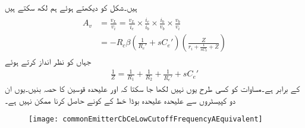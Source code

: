 ہیں۔شکل کو دیکھتے ہوئے ہم لکھ سکتے ہیں
\begin{gather}
\begin{aligned}\label{مساوات_تعددی_ردعمل_قابو_مخارج_کپیسٹر}
A_v&=\frac{v_L}{v_i}=\frac{v_L}{i_c} \times \frac{i_c}{i_b} \times \frac{i_b}{v_b} \times \frac{v_b}{v_i}\\
&=-R_c \beta \left(\frac{1}{R_e'}+s C_e' \right) \left(\frac{Z}{r_i+\frac{1}{sC_b}+Z} \right)
\end{aligned}
\end{gather}
جہاں  کو نظر انداز کرتے ہوئے
\begin{align*}
\frac{1}{Z}=\frac{1}{R_1}+\frac{1}{R_2}+\frac{1}{R_e'}+s C_e'
\end{align*}
کے برابر ہے۔مساوات   کو کسی طرح یوں نہیں لکھا جا سکتا کہ  اور  علیحدہ قوسین کا حصہ بنیں۔یوں ان دو کپیسٹروں سے علیحدہ علیحدہ بوڈا خط کے کونے حاصل کرنا ممکن نہیں ہے۔
%
\begin{figure}
\centering
\texttt{[image: commonEmitterCbCeLowCutoffFrequencyAEquivalent]}
\caption{}
\label{شکل_تعددی_رد_عمل_قابو_مخارج_کپیسٹر_ب}
\end{figure}

